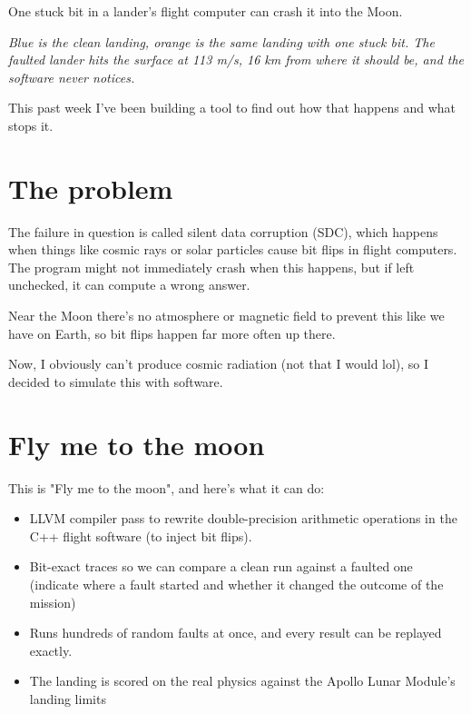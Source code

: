 

\newcommand{\DocTitle}{Week 1 of teaching a lunar lander to survive bad hardware}
\newcommand{\DocDescription}{one stuck bit, one very bad landing}
\newcommand{\DocTags}{writeup, low-level, space}



One stuck bit in a lander's flight computer can crash it into the Moon.


\textit{Blue is the clean landing, orange is the same landing with one stuck bit. The faulted lander hits the surface at 113 m/s, 16 km from where it should be, and the software never notices.}

This past week I've been building a tool to find out how that happens and what stops it.

\section{The problem}

The failure in question is called silent data corruption (SDC), which happens when things like cosmic rays or solar particles cause bit flips in flight computers. The program might not immediately crash when this happens, but if left unchecked, it can compute a wrong answer.

Near the Moon there's no atmosphere or magnetic field to prevent this like we have on Earth, so bit flips happen far more often up there.

Now, I obviously can't produce cosmic radiation (not that I would lol), so I decided to simulate this with software.

\section{Fly me to the moon}

This is "Fly me to the moon", and here's what it can do:

\begin{itemize}
\item LLVM compiler pass to rewrite double-precision arithmetic operations in the C++ flight software (to inject bit flips).
\item Bit-exact traces so we can compare a clean run against a faulted one (indicate where a fault started and whether it changed the outcome of the mission)
\item Runs hundreds of random faults at once, and every result can be replayed exactly.
\item The landing is scored on the real physics against the Apollo Lunar Module's landing limits
\end{itemize}

